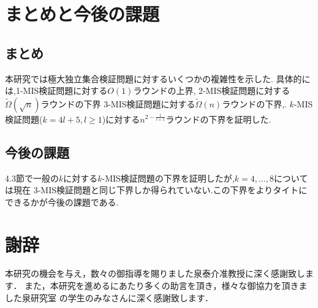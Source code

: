 \documentclass[12pt]{thesis}
\theoremstyle{definition}
\begin{document}
\newpage

\chapter{まとめと今後の課題}
\section{まとめ}
本研究では極大独立集合検証問題に対するいくつかの複雑性を示した.
具体的には,1-MIS検証問題に対する$O(1)$ラウンドの上界,
2-MIS検証問題に対する$\tilde{\Omega} (\sqrt{n})$ラウンドの下界
3-MIS検証問題に対する$\tilde{\Omega} (n)$ラウンドの下界,.
$k$-MIS検証問題($k = 4l + 5, l \geq 1$)に対する$n^{2 - \frac{1}{l + 1}}$ラウンドの下界を証明した.

\section{今後の課題}
4.3節で一般の$k$に対する$k$-MIS検証問題の下界を証明したが,$k = 4,...,8$については現在
3-MIS検証問題と同じ下界しか得られていない.この下界をよりタイトにできるかが今後の課題である.
\newpage

\chapter*{謝辞}
本研究の機会を与え，数々の御指導を賜りました泉泰介准教授に深く感謝致します．
また，本研究を進めるにあたり多くの助言を頂き，様々な御協力を頂きました泉研究室
の学生のみなさんに深く感謝致します．

\newpage


\end{document}
